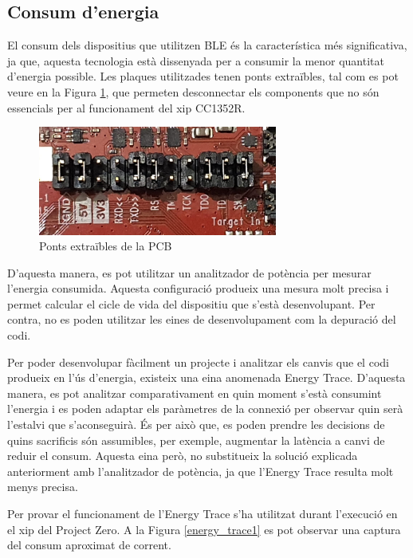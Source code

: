 \subsection{Consum d'energia}

El consum dels dispositius que utilitzen BLE és la característica més significativa, ja que, aquesta tecnologia està dissenyada per a consumir la menor quantitat d'energia possible.
Les plaques utilitzades tenen ponts extraïbles, tal com es pot veure en la Figura \ref{ponts_extraibles}, que permeten desconnectar els components que no són essencials per al funcionament del xip CC1352R.

\begin{figure}[h]
	\begin{center}
		\includegraphics[width=0.7\textwidth]{./images/ponts.jpg}
		\caption{Ponts extraïbles de la PCB}
		\label{ponts_extraibles}
	\end{center}
\end{figure}

D'aquesta manera, es pot utilitzar un analitzador de potència per mesurar l'energia consumida.
Aquesta configuració produeix una mesura molt precisa i permet calcular el cicle de vida del dispositiu que s'està desenvolupant.
Per contra, no es poden utilitzar les eines de desenvolupament com la depuració del codi.

Per poder desenvolupar fàcilment un projecte i analitzar els canvis que el codi produeix en l'ús d'energia, existeix una eina anomenada Energy Trace.
D'aquesta manera, es pot analitzar comparativament en quin moment s'està consumint l'energia i es poden adaptar els paràmetres de la connexió per observar quin serà l'estalvi que s'aconseguirà.
És per això que, es poden prendre les decisions de quins sacrificis són assumibles, per exemple, augmentar la latència a canvi de reduir el consum.
Aquesta eina però, no substitueix la solució explicada anteriorment amb l'analitzador de potència, ja que l'Energy Trace resulta molt menys precisa.

Per provar el funcionament de l'Energy Trace s'ha utilitzat durant l'execució en el xip del Project Zero.
A la Figura \ref{energy_trace1} es pot observar una captura del consum aproximat de corrent.

